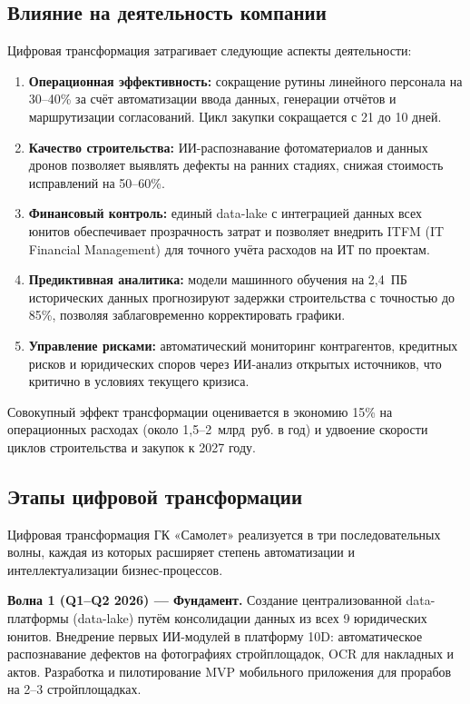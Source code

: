 \documentclass[12pt,a4paper]{article}
\begin{document}
\subsection{Влияние на деятельность компании}

Цифровая трансформация затрагивает следующие аспекты деятельности:

\begin{enumerate}[leftmargin=20pt]
  \item \textbf{Операционная эффективность:} сокращение рутины линейного персонала на 30--40\% за счёт автоматизации ввода данных, генерации отчётов и маршрутизации согласований. Цикл закупки сокращается с 21 до 10 дней.

  \item \textbf{Качество строительства:} ИИ-распознавание фотоматериалов и данных дронов позволяет выявлять дефекты на ранних стадиях, снижая стоимость исправлений на 50--60\%.

  \item \textbf{Финансовый контроль:} единый data-lake с интеграцией данных всех юнитов обеспечивает прозрачность затрат и позволяет внедрить ITFM (IT Financial Management) для точного учёта расходов на ИТ по проектам.

  \item \textbf{Предиктивная аналитика:} модели машинного обучения на 2,4~ПБ исторических данных прогнозируют задержки строительства с точностью до 85\%, позволяя заблаговременно корректировать графики.

  \item \textbf{Управление рисками:} автоматический мониторинг контрагентов, кредитных рисков и юридических споров через ИИ-анализ открытых источников, что критично в условиях текущего кризиса.
\end{enumerate}

Совокупный эффект трансформации оценивается в экономию 15\% на операционных расходах (около 1,5--2~млрд~руб. в год) и удвоение скорости циклов строительства и закупок к 2027 году.

\subsection{Этапы цифровой трансформации}

Цифровая трансформация ГК «Самолет» реализуется в три последовательных волны, каждая из которых расширяет степень автоматизации и интеллектуализации бизнес-процессов.

\textbf{Волна 1 (Q1--Q2 2026) --- Фундамент.} Создание централизованной data-платформы (data-lake) путём консолидации данных из всех 9 юридических юнитов. Внедрение первых ИИ-модулей в платформу 10D: автоматическое распознавание дефектов на фотографиях стройплощадок, OCR для накладных и актов. Разработка и пилотирование MVP мобильного приложения для прорабов на 2--3 стройплощадках.
\end{document}
